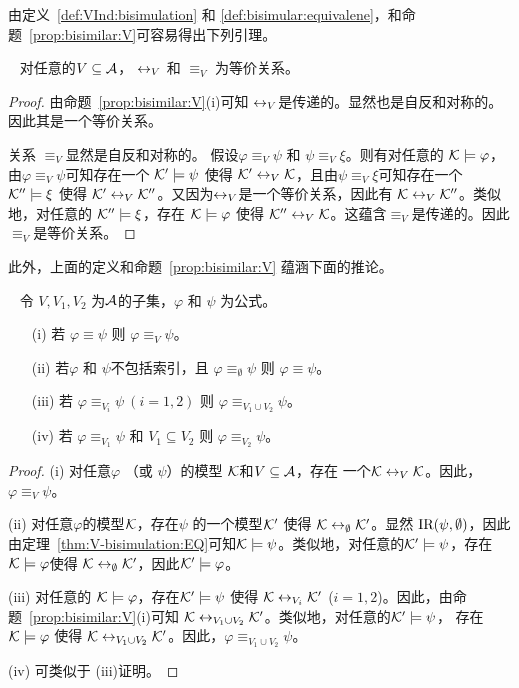 由定义~\ref{def:VInd:bisimulation} 和 \ref{def:bisimular:equivalene}，和命题~\ref{prop:bisimilar:V}可容易得出下列引理。
\begin{lemma}~\label{lem:eqR}
	对任意的$V\subseteq\cal A$，  $\leftrightarrow_V$  和 $\equiv_V$ 为等价关系。
\end{lemma}
\begin{proof}
  由命题~\ref{prop:bisimilar:V}(i)可知 $\leftrightarrow_V$是传递的。显然也是自反和对称的。因此其是一个等价关系。

  关系 $\equiv_V$显然是自反和对称的。
  假设$\varphi\equiv_V\psi$ 和 $\psi\equiv_V\xi$。则有对任意的 ${\cal K}\models\varphi$，由$\varphi\equiv_V\psi$可知存在一个 ${\cal K}'\models\psi$ \hbox{使得} ${\cal K}'\leftrightarrow_V{\cal K}$，且由$\psi\equiv_V\xi$可知存在一个 ${\cal K}''\models\xi$ \hbox{使得}
  ${\cal K}'\leftrightarrow_V{\cal K}''$。又因为$\leftrightarrow_V$是一个等价关系，因此有
  ${\cal K}\leftrightarrow_V{\cal K}''$。类似地，对任意的 ${\cal K}''\models\xi$，存在 ${\cal K}\models \varphi$
  \hbox{使得} ${\cal K}''\leftrightarrow_V{\cal K}$。这蕴含$\equiv_V$是传递的。因此$\equiv_V$是等价关系。
\end{proof} 

此外，上面的定义和命题~\ref{prop:bisimilar:V} 蕴涵下面的推论。
\begin{corollary}~\label{cor:eqbi}
	令 $V,V_1,V_2$ 为$\cal A$的子集，$\varphi$ 和 $\psi$ 为公式。
	\begin{itemize}
		\item[(i)] 若 $\varphi\equiv\psi$ 则 $\varphi\equiv_V\psi$。
		\item[(ii)] 若$\varphi$ 和 $\psi$不包括索引，且 $\varphi\equiv_\emptyset\psi$ 则 $\varphi\equiv\psi$。
		\item[(iii)] 若 $\varphi\equiv_{V_i}\psi~(i=1,2)$ 则 $\varphi\equiv_{V_1\cup V_2}\psi$。
		\item[(iv)] 若 $\varphi\equiv_{V_1}\psi$ 和 $V_1\subseteq V_2$ 则 $\varphi\equiv_{V_2}\psi$。
	\end{itemize}
\end{corollary}
\begin{proof}
	(i) 对任意$\varphi$ （或 $\psi$）的模型 ${\cal K}$和$V \subseteq {\cal A}$，存在 一个${\cal K} \leftrightarrow_V {\cal K}$。因此， $\varphi\equiv_V\psi$。
	
	(ii) 对任意$\varphi$的模型${\cal K}$，存在$\psi$ 的一个模型${\cal K}'$ 使得 ${\cal K} \leftrightarrow_{\emptyset} {\cal K}'$。显然 $\textrm{IR}(\psi, \emptyset)$，因此由定理~\ref{thm:V-bisimulation:EQ}可知${\cal K} \models \psi$。类似地，对任意的${\cal K}' \models \psi$，存在 ${\cal K} \models \varphi$使得 ${\cal K} \leftrightarrow_{\emptyset} {\cal K}'$，因此${\cal K}'\models \varphi$。
	
	(iii) 对任意的 ${\cal K} \models \varphi$，存在${\cal K}' \models \psi$ 使得 ${\cal K} \leftrightarrow_{V_i} {\cal K}'$ ($i=1,2$)。因此，由命题~\ref{prop:bisimilar:V}(i)可知 ${\cal K} \leftrightarrow_{V_1\cup V_2} {\cal K}'$。类似地，对任意的${\cal K}' \models \psi$， 存在 ${\cal K} \models \varphi$ 使得 ${\cal K} \leftrightarrow_{V_1\cup V_2} {\cal K}'$。因此，$\varphi\equiv_{V_1\cup V_2}\psi$。
	
	(iv) 可类似于 (iii)证明。
\end{proof}

